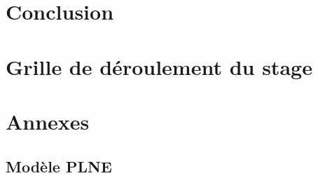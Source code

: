 \documentclass[a4paper,12pt,french]{article}
\begin{document}
\section{Conclusion}


\section{Grille de déroulement du stage}


\newpage

\printbibliography[
heading=bibintoc,
title={Bibliographie}
]

\newpage
\section*{Annexes}

\subsection*{Modèle PLNE} \label{annexe:modeleexact}

\end{document}
